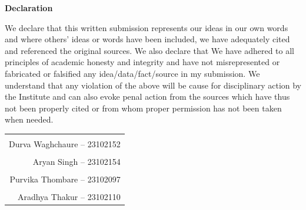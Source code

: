 \documentclass[12pt,a4paper]{report}
\begin{document}
\newpage
\thispagestyle{plain}

\begin{center}
    \vspace*{0.2cm}
    {\fontsize{16pt}{20pt}\selectfont \textbf{Declaration}\par}
\end{center}

\vspace{0.5cm}
\noindent We declare that this written submission represents our ideas in our own words and where others' ideas or words have been included, we have adequately cited and referenced the original sources. We also declare that We have adhered to all principles of academic honesty and integrity and have not misrepresented or fabricated or falsified any idea/data/fact/source in my submission. We understand that any violation of the above will be cause for disciplinary action by the Institute and can also evoke penal action from the sources which have thus not been properly cited or from whom proper permission has not been taken when needed.

\vspace{1.8cm}
\begin{flushright}
\begin{tabular}{r}
    \underline{\hspace{6.0cm}} \\[-0.2cm]
    Durva Waghchaure -- 23102152 \\[1.0cm]
    \underline{\hspace{6.0cm}} \\[-0.2cm]
    Aryan Singh -- 23102154 \\[1.0cm]
    \underline{\hspace{6.0cm}} \\[-0.2cm]
    Purvika Thombare -- 23102097 \\[1.0cm]
    \underline{\hspace{6.0cm}} \\[-0.2cm]
    Aradhya Thakur -- 23102110 \\
\end{tabular}
\end{flushright}
\end{document}
